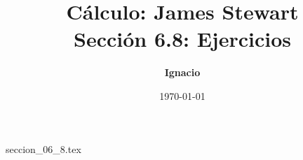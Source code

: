 \documentclass[11pt,spanish,oneside]{report}
\title{\textbf{Cálculo: James Stewart} \\ \Large Sección 6.8: Ejercicios}
\author{\textbf{Ignacio}}
\date{\today}
\begin{document}
\maketitle

{seccion_06_8.tex}
\end{document}
